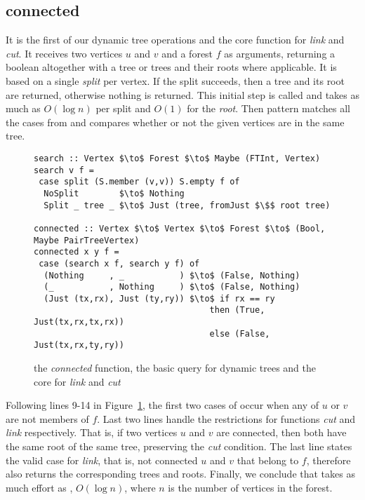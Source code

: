 \subsection{connected} 
It is the first of our dynamic tree operations and the core function for \textit{link} and \textit{cut}. It receives two vertices $u$ and $v$ and a forest $f$ as arguments, returning a boolean altogether with a tree or trees and their roots where applicable. It is based on a single \textit{split} per vertex. If the split succeeds, then a tree and its root are returned, otherwise nothing is returned. This initial step is called  and takes as much as $O(\log n)$ per split and $O(1)$ for the \textit{root}. Then  pattern matches all the cases from  and compares whether or not the given vertices are in the same tree. 

\begin{figure}
\begin{lstlisting}[mathescape] 
search :: Vertex $\to$ Forest $\to$ Maybe (FTInt, Vertex) 
search v f = 
 case split (S.member (v,v)) S.empty f of 
  NoSplit        $\to$ Nothing 
  Split _ tree _ $\to$ Just (tree, fromJust $\$$ root tree) 

connected :: Vertex $\to$ Vertex $\to$ Forest $\to$ (Bool, Maybe PairTreeVertex) 
connected x y f = 
 case (search x f, search y f) of 
  (Nothing     , _           ) $\to$ (False, Nothing) 
  (_           , Nothing     ) $\to$ (False, Nothing) 
  (Just (tx,rx), Just (ty,ry)) $\to$ if rx == ry 
                                   then (True,  Just(tx,rx,tx,rx))  
                                   else (False, Just(tx,rx,ty,ry))  
\end{lstlisting} 
\caption{the \textit{connected} function, the basic query for dynamic trees and the core for \textit{link} and \textit{cut}}
\label{fig:connected}
\end{figure}
Following lines 9-14 in Figure~\ref{fig:connected}, the first two cases of  occur when any of $u$ or $v$ are not members of $f$. Last two lines handle the restrictions for functions \textit{cut} and \textit{link} respectively. That is, if two vertices $u$ and $v$ are connected, then both have the same root of the same tree, preserving the \textit{cut} condition. The last line states the valid case for \textit{link}, that is, not connected $u$ and $v$ that belong to $f$, therefore  also returns the corresponding trees and roots. Finally, we conclude that  takes as much effort as , $O(\log n)$, where $n$ is the number of vertices in the forest.

